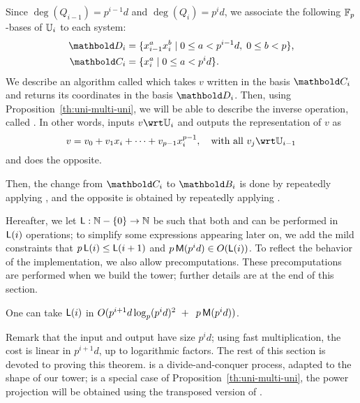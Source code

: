 {\ifafourps{}\fi
Since $\deg(Q_{i-1})=p^{i-1}d$ and $\deg(Q_{i})=p^id$, we associate
the following $\mathbb{F}_p$-bases of $\mathbb{U}_i$ to each system:
\begin{align}
  \pdfmctwo{Explicit indices for the basis.}
  \basis{D}_i &= \{x_{i-1}^ax_i^b \;|\; 0\le a<p^{i-1}d,\; 0\le b<p\}
  \text{,}\\
  \label{eq:bases}
 \basis{C}_i&=\{x_i^a \;|\; 0\le a<p^id\}
 \text{.}  
\end{align}
We describe an algorithm called  which takes $v$
written in the basis $\basis{C}_i$ and returns its coordinates in the
basis $\basis{D}_i$. Then, using Proposition~\ref{th:uni-multi-uni},
we will be able to describe the inverse operation, called
.
In other words,  inputs $v\wrt\U_i$ and
outputs the representation of $v$ as
\begin{equation}
  \label{eq:vectorspace}
  v = v_0 + v_1x_i + \cdots + v_{p-1}x_i^{p-1}, \quad\text{with all~} v_j \wrt \U_{i-1}
\end{equation}
and  does the opposite.}

Then, the change from $\basis{C}_i$ to $\basis{B}_i$ is done by
repeatedly applying , and the opposite is obtained by
repeatedly applying .

Hereafter, we let $\mathsf{L}:\mathbb{N}-\{0\} \to \mathbb{N}$ be such that both
 and  can be performed in
$\mathsf{L}(i)$ operations; to simplify some expressions appearing later
on, we add the mild constraints that $p\,\mathsf{L}(i) \le \mathsf{L}(i+1)$ and
$p\,\mathsf{M}(p^{i}d) \in O(\mathsf{L}(i))$.  To reflect the behavior of the
implementation, we also allow precomputations. These precomputations
are performed when we build the tower; further details are at the end
of this section.
\begin{theorem}\label{theo:L}
  One can take $\mathsf{L}(i)$ in $O( p^{i+1}d\log_p(p^id)^2 \ + \
\,p\,\mathsf{M}(p^{i}d))$.
\end{theorem}
Remark that the input and output have size $p^id$; using fast
multiplication, the cost is linear in $p^{i+1}d$, up to logarithmic
factors. The rest of this section is devoted to proving this theorem.
\titleref{alg:push-down} is a divide-and-conquer process, adapted to the shape
of our tower; \titleref{alg:liftup} is a special case of
Proposition~\ref{th:uni-multi-uni}, the power projection will be
obtained using the transposed version of \titleref{alg:push-down}.

